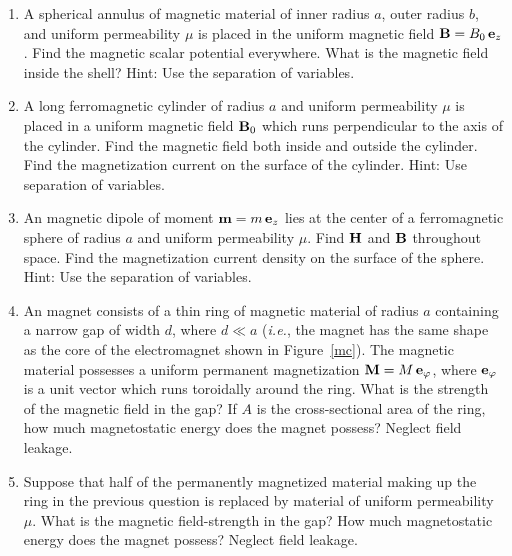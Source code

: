 {\begin{enumerate}
a uniform magnetic  field ${\bf B}_0$.  Find the magnetic field inside
a needle-shaped cavity running parallel to ${\bf B}_0$. Find the field
inside a wafer-shaped cavity aligned perpendicular to ${\bf B}_0$. Neglect
end effects.
\item A spherical annulus of magnetic material of inner radius $a$,  outer
radius $b$, and uniform permeability $\mu$ is placed in the
uniform magnetic field ${\bf B} = B_0\,{\bf e}_z$. Find the magnetic
scalar potential everywhere. What is the magnetic field inside the shell?
Hint: Use the separation of variables.
\item A long ferromagnetic cylinder of radius $a$ and uniform permeability  
$\mu$ is placed in a uniform magnetic field ${\bf B}_0$ which
runs perpendicular to the axis of the cylinder. Find the magnetic
field both inside and outside the cylinder. Find the magnetization current
 on the surface of the cylinder. Hint: Use separation of variables.
\item An magnetic dipole of moment ${\bf m} = m\,{\bf e}_z$ lies at the center of a ferromagnetic sphere of radius $a$
and uniform permeability $\mu$. Find ${\bf H}$ and ${\bf B}$
throughout space. Find the magnetization current density on the surface of the
sphere. Hint: Use the separation of variables.
\item An magnet consists of a thin ring of magnetic material of radius
$a$ containing a narrow gap of width $d$, where $d\ll a$ ({\em i.e.}, the magnet has the
same shape as the core of the electromagnet shown in Figure~\ref{mc}).
The magnetic material possesses a
uniform permanent magnetization ${\bf M} = M\,{\bf e}_\varphi$, where
${\bf e}_\varphi$ is a unit vector which runs toroidally around the ring.
What is the strength of the magnetic field in the gap? If $A$ is the cross-sectional area of the ring, how much magnetostatic energy does the magnet possess? Neglect field leakage.
\item Suppose that half of the permanently magnetized material making up the
ring in the previous question is replaced by material of uniform permeability
$\mu$. What is the magnetic field-strength in the gap? How much magnetostatic energy does the magnet possess? Neglect field
leakage.
\end{enumerate}
\renewcommand{\theenumi}{arabic{enumi}}
}
